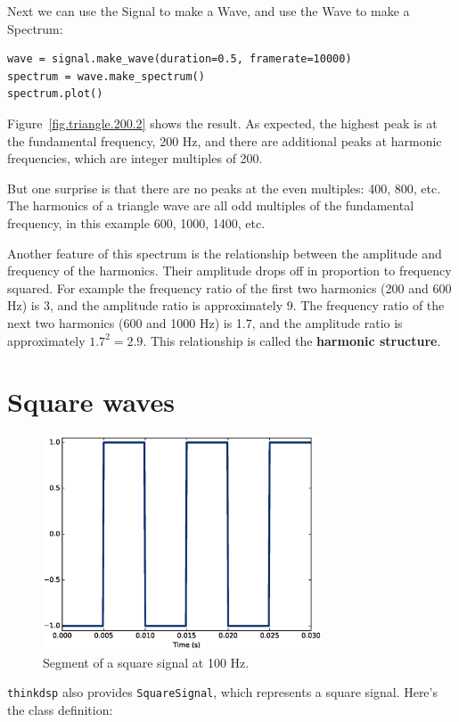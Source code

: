 \documentclass[12pt]{book}
\begin{document}
Next we can use the Signal to make a Wave, and use the Wave to
make a Spectrum:

\begin{verbatim}
wave = signal.make_wave(duration=0.5, framerate=10000)
spectrum = wave.make_spectrum()
spectrum.plot()
\end{verbatim}

Figure~\ref{fig.triangle.200.2} shows the result.  As expected, the
highest peak is at the fundamental frequency, 200 Hz, and there
are additional peaks at harmonic frequencies, which are integer
multiples of 200.

But one surprise is that there are no peaks at the even multiples:
400, 800, etc.  The harmonics of a triangle wave are all
odd multiples of the fundamental frequency, in this example
600, 1000, 1400, etc.

Another feature of this spectrum is the relationship between the
amplitude and frequency of the harmonics.  Their amplitude drops off
in proportion to frequency squared.  For example the frequency ratio
of the first two harmonics (200 and 600 Hz) is 3, and the amplitude
ratio is approximately 9.  The frequency ratio of the next two
harmonics (600 and 1000 Hz) is 1.7, and the amplitude ratio is
approximately $1.7^2 = 2.9$.  This relationship is called the
{\bf harmonic structure}.


\section{Square waves}
\label{square}

\begin{figure}
\centerline{\includegraphics[height=2.5in]{figs/square-100-1.eps}}
\caption{Segment of a square signal at 100 Hz.}
\label{fig.square.100.1}
\end{figure}

{\tt thinkdsp} also provides {\tt SquareSignal}, which represents
a square signal.  Here's the class definition:
\end{document}
